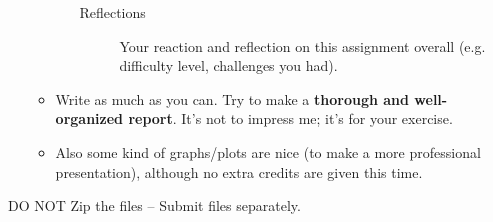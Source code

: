 \documentclass[11pt]{article}
\begin{document}
\begin{enumerate}
\begin{itemize}
\begin{itemize}
\begin{description}
\item[{Reflections}] Your reaction and reflection on this assignment overall (e.g. difficulty level, challenges you had).
\end{description}
\end{itemize}
\item Write as much as you can.  Try to make a \textbf{thorough and well-organized report}.  It's not to impress me; it's for your exercise.
\item Also some kind of graphs/plots are nice (to make a more professional presentation), although no extra credits are given this time.
\end{itemize}
\end{enumerate}



DO NOT Zip the files -- Submit files separately.
\end{document}
